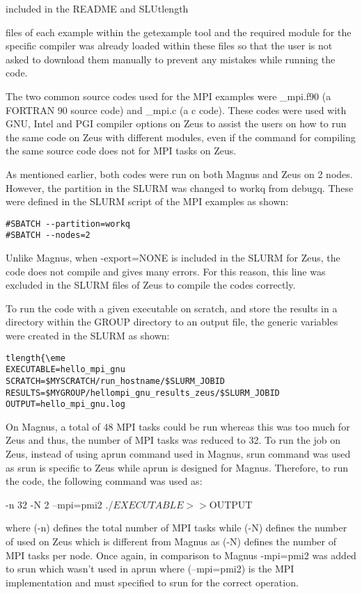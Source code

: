 \documentclass[journal]{IEEEtran}
\begin{document}
included in the README and SLUtlength{\emeRM files of each example within the getexample tool and the required module for the specific compiler was already loaded 
within these files so that the user is not asked to download them manually to prevent any mistakes while running the code.

The two common source codes used for the MPI examples were \hello_mpi.f90 (a FORTRAN 90 source code) and \hello_mpi.c (a c code). These codes were used 
with GNU, Intel and PGI compiler options on Zeus to assist the users on how to run the same code on Zeus with different modules, even if the command 
for compiling the same source code does not for MPI tasks on Zeus.

As mentioned earlier, both codes were run on both Magnus and Zeus on 2 nodes. However, the partition in the SLURM was changed to workq from debugq.
These were defined in the SLURM script of the MPI examples as shown: 

\begin{verbatim}
#SBATCH --partition=workq
#SBATCH --nodes=2
\end{verbatim}

Unlike Magnus, when \--export=NONE is included in the SLURM for Zeus, the code does not compile and gives many errors. For this reason, this line was
excluded in the SLURM files of Zeus to compile the codes correctly.

To run the code with a given executable on scratch, and store the results in a directory within the GROUP directory to an output file, the generic 
variables were created in the SLURM as shown:

\begin{verbatim}tlength{\eme
EXECUTABLE=hello_mpi_gnu
SCRATCH=$MYSCRATCH/run_hostname/$SLURM_JOBID
RESULTS=$MYGROUP/hellompi_gnu_results_zeus/$SLURM_JOBID
OUTPUT=hello_mpi_gnu.log
\end{verbatim}

On Magnus, a total of 48 MPI tasks could be run whereas this was too much for Zeus and thus, the number of MPI tasks was reduced to 32. To run the job
on Zeus, instead of using aprun command used in Magnus, srun command was used as srun is specific to Zeus while aprun is designed for Magnus. Therefore,
to run the code, the following command was used as:

\srun -n 32 -N 2 --mpi=pmi2 ./$EXECUTABLE >> ${OUTPUT}


where (-n) defines the total number of MPI tasks while (-N) defines the number of used on Zeus which is different from Magnus as (-N) defines the number of
MPI tasks per node. Once again, in comparison to Magnus \--mpi=pmi2 was added to srun which wasn't used in aprun where (--mpi=pmi2) is the MPI
implementation and must specified to srun for the correct operation.

}
\end{document}
